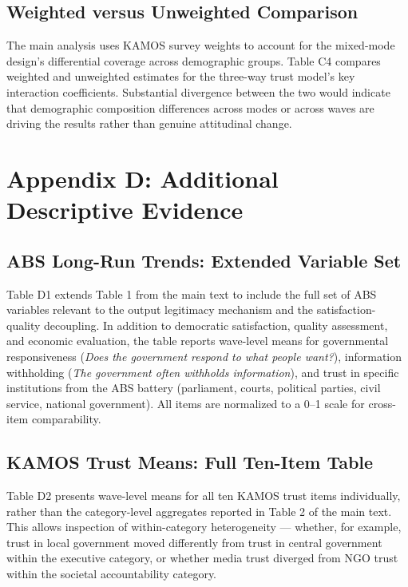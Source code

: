 \documentclass[
  12pt,
  letterpaper]{article}
\begin{document}
\subsection{Weighted versus Unweighted Comparison}\label{sec-weights}

The main analysis uses KAMOS survey weights to account for the
mixed-mode design's differential coverage across demographic groups.
Table C4 compares weighted and unweighted estimates for the three-way
trust model's key interaction coefficients. Substantial divergence
between the two would indicate that demographic composition differences
across modes or across waves are driving the results rather than genuine
attitudinal change.

\section{Appendix D: Additional Descriptive
Evidence}\label{sec-descriptive-additional}

\subsection{ABS Long-Run Trends: Extended Variable
Set}\label{sec-abs-extended}

Table D1 extends Table 1 from the main text to include the full set of
ABS variables relevant to the output legitimacy mechanism and the
satisfaction-quality decoupling. In addition to democratic satisfaction,
quality assessment, and economic evaluation, the table reports
wave-level means for governmental responsiveness (\emph{Does the
government respond to what people want?}), information withholding
(\emph{The government often withholds information}), and trust in
specific institutions from the ABS battery (parliament, courts,
political parties, civil service, national government). All items are
normalized to a 0--1 scale for cross-item comparability.

\subsection{KAMOS Trust Means: Full Ten-Item
Table}\label{sec-kamos-full}

Table D2 presents wave-level means for all ten KAMOS trust items
individually, rather than the category-level aggregates reported in
Table 2 of the main text. This allows inspection of within-category
heterogeneity --- whether, for example, trust in local government moved
differently from trust in central government within the executive
category, or whether media trust diverged from NGO trust within the
societal accountability category.
\end{document}
